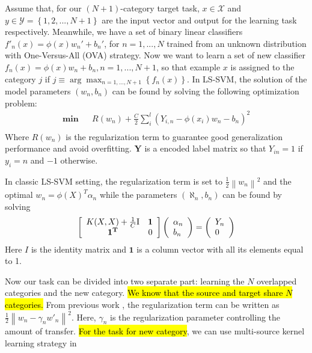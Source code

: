 Assume that, for our $(N+1)$-category target task, ${x} \in \mathcal{X}$ and ${y} \in \mathcal{Y}=\left\{1,2,...,N+1\right\}$ are the input vector and output for the learning task respectively. Meanwhile, we have a set of binary linear classifiers $f'_n(x)=\phi(x)w_n'+b_n'$, for $n=1,...,N$ trained from an unknown distribution with One-Versus-All (OVA) strategy.  Now we want to learn a set of new classifier $f_n(x)=\phi(x)w_n+b_n, n=1,...,N+1$, so that example $x$ is assigned to the category $j$ if $j \equiv \arg {\max _{n = 1,...,N+1}}\left\{{f_n}(x)\right\}$. In LS-SVM, the solution of the model parameters $(w_n,b_n)$ can be found by solving the following optimization problem:
\begin{equation*}
\begin{aligned}
\textbf{min} && R({w_n}) + \frac{C}{2}\sum\limits_i^l {({Y_{i,n}} - \phi ({x_i}){w_n} - {b_n})^2} \\
\end{aligned}
\end{equation*}
Where $R({w_n})$ is the regularization term to guarantee good generalization performance and avoid overfitting. $\mathbf{Y}$ is a encoded label matrix so that $Y_{in}=1$ if $y_i=n$ and $-1$ otherwise.  

In classic LS-SVM setting, the regularization term is set to $\frac{1}{2}\left\|w_n\right\|^2$ and the optimal $w_n=\phi(X)^T\alpha_n$ while the parameters $(\aleph_n,b_n)$ can be found by solving
\begin{equation}\label{eq:linear}
\left[ {\begin{array}{*{20}{c}}
{K(X,X) + \frac{1}{C}{\rm{I}}}&\mathbf{1}\\
\mathbf{1^T}&0
\end{array}} \right]\left( \begin{array}{l}
{\alpha _n}\\
{b_n}
\end{array} \right) = \left( \begin{array}{l}
{Y_n}\\
0
\end{array} \right)  
\end{equation}
Here $I$ is the identity matrix and $\mathbf{1}$ is a column vector with all its elements equal to 1.

Now our task can be divided into two separate part: learning the $N$ overlapped categories and the new category. 
\hl{We know that the source and target share $N$ categories.} From previous work \cite{yang2007cross}, the regularization term can be written as $\frac{1}{2}{{{\left\| {{w_n} - {\gamma _n}{{w'}_n}} \right\|}^2}}$. Here, $\gamma_n$ is the regularization parameter controlling the amount of transfer.
\hl{For the task for new category}, we can use multi-source kernel learning strategy in \cite{tommasi2014learning} 


